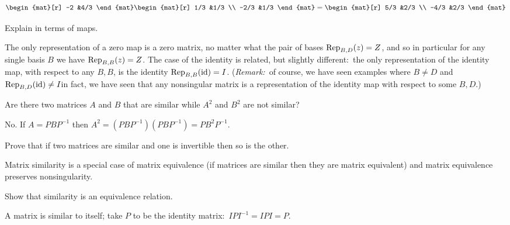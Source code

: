 \begin{exercises}
\begin{answer}
\begin{equation*}
\begin{mat}[r]
           -2  &4/3
         \end{mat}
         \begin{mat}[r]
           1/3 &1/3 \\
          -2/3 &1/3
         \end{mat}
         =
         \begin{mat}[r]
           5/3 &2/3 \\
          -4/3 &2/3
         \end{mat}
      \end{equation*}  
    \end{answer}
  \item 
    Explain  in terms of maps.
    \begin{answer}
      The only representation of a zero map is a zero matrix,
      no matter what the pair of bases $\rep{z}{B,D}=Z$,
      and so in particular for any single basis $B$ we have $\rep{z}{B,B}=Z$.  
      The case of the identity is related, but slightly different:~the 
      only representation of the identity map, with respect to any $B,B$, 
      is the identity $\rep{\identity}{B,B}=I$.
      (\textit{Remark:}~of course, we have seen examples where $B\neq D$ and 
      $\rep{\identity}{B,D}\neq I$\Dash in fact, we have seen that any 
      nonsingular matrix is a representation of the identity map with
      respect to some $B,D$.)
    \end{answer}
  \recommended \item 
    \cite{Halmos}
    Are there two matrices \( A \) and \( B \) that are
    similar while \( A^2 \) and \( B^2 \) are not similar?
    \begin{answer}
      No.
      If \( A=PBP^{-1} \) then \( A^2=(PBP^{-1})(PBP^{-1})=PB^2P^{-1} \).
    \end{answer}
  \recommended \item
    Prove that if two matrices are similar and one is invertible then
    so is the other.
    \begin{answer}
       Matrix similarity is a special case of matrix equivalence 
       (if matrices are similar then they are matrix equivalent)
       and matrix equivalence preserves nonsingularity.
    \end{answer}
  \recommended \item \label{exer:SimIsEquivRel}
    Show that similarity is an equivalence relation.
    \begin{answer}
       A matrix is similar to itself; take \( P \) to be the identity
       matrix:~$IPI^{-1}=IPI=P$.


\end{answer}
\end{exercises}
